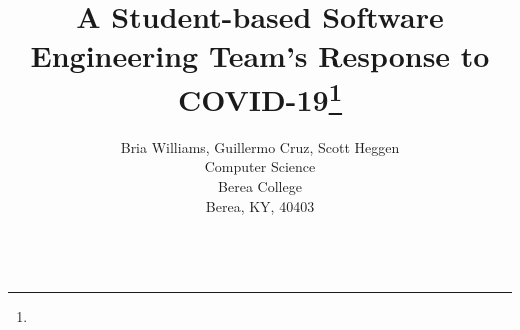 \documentclass{article}
\title{A Student-based Software Engineering Team's Response to COVID-19\footnote{\protect}}
\author{
Bria Williams, Guillermo Cruz, Scott Heggen\\
Computer Science\\
Berea College\\
Berea, KY, 40403\\
\email{\{williamsbri,cruzg,heggens\}@berea.edu}\\
}
\begin{document}
\maketitle

\begin{abstract}
 
\end{abstract}


% 





\medskip



\end{document}
